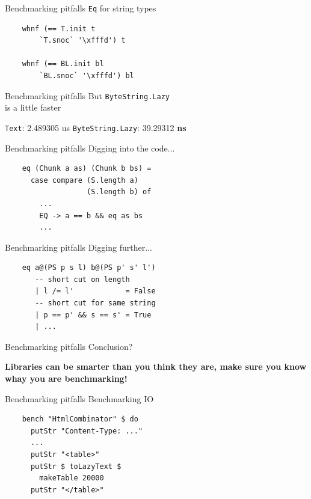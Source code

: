 \documentclass[20pt]{beamer}
\newcommand{\vspaced}{
    \vspace{5mm}
}
\begin{document}
\begin{frame}[fragile]{Benchmarking pitfalls}
    \texttt{Eq} for string types \\
    \vspaced
    \begin{lstlisting}
    whnf (== T.init t
        `T.snoc` '\xfffd') t

    whnf (== BL.init bl
        `BL.snoc` '\xfffd') bl
    \end{lstlisting}
\end{frame}

\begin{frame}{Benchmarking pitfalls}
    But \texttt{ByteString.Lazy} \\
    is a little faster \\
    \vspaced
    \texttt{Text}: 2.489305 us
    \texttt{ByteString.Lazy}: 39.29312 \textbf{ns}
\end{frame}

\begin{frame}[fragile]{Benchmarking pitfalls}
    Digging into the code... \\
    \vspaced
    \begin{lstlisting}
    eq (Chunk a as) (Chunk b bs) =
      case compare (S.length a)
                   (S.length b) of
        ...
        EQ -> a == b && eq as bs
        ...
    \end{lstlisting}
\end{frame}

\begin{frame}[fragile]{Benchmarking pitfalls}
    Digging further... \\
    \vspaced
    \begin{lstlisting}
    eq a@(PS p s l) b@(PS p' s' l')
       -- short cut on length
       | l /= l'            = False
       -- short cut for same string
       | p == p' && s == s' = True
       | ...
    \end{lstlisting}
\end{frame}

\begin{frame}{Benchmarking pitfalls}
    Conclusion? \\
    \vspaced
    \textbf{Libraries can be smarter than you think they are, make sure you know
    whay you are benchmarking!}
\end{frame}

\begin{frame}[fragile]{Benchmarking pitfalls}
    Benchmarking IO \\
    \vspaced
    \begin{lstlisting}
    bench "HtmlCombinator" $ do
      putStr "Content-Type: ..."
      ...
      putStr "<table>"
      putStr $ toLazyText $
        makeTable 20000
      putStr "</table>"
    \end{lstlisting}
\end{frame}
\end{document}
